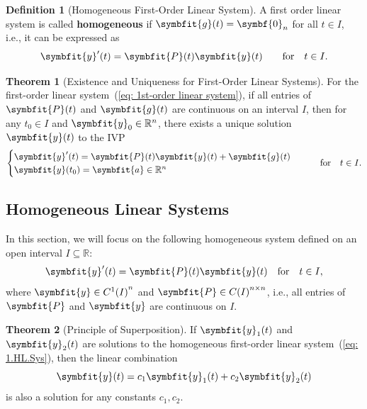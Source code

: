 \documentclass[10pt,UTF8]{article}
\newcommand{\mat}[1]{\symbfit{#1}}
\renewcommand{\vec}[1]{%
  \ifnum0\ifcat#1a1\else0\fi>0
  \symbfit{#1}  %
  \else
  \symbf{#1}  %
  \fi
}
\newenvironment{definitionBox}
{ \bigskip
  \begin{tcolorbox}[colback=blue!5!white,colframe=blue!75!black,parbox=false,before
  upper=\par,before lower=\par]}
  {
\end{tcolorbox}}
\newenvironment{theoremBox}
{ \bigskip
  \begin{tcolorbox}[colback=yellow!5!white,colframe=yellow!75!black,parbox=false,before
  upper=\par,before lower=\par]}
  {
\end{tcolorbox}}
\theoremstyle{definition}
\newtheorem{definition inner}{Definition}[section]
\newenvironment{definition}[1][]
{
  \begin{definitionBox}
  \begin{definition inner}[#1]\hfill\par}
    {
    \end{definition inner}
\end{definitionBox}}
\theoremstyle{definition}
\newtheorem{theorem inner}{Theorem}[section]
\newenvironment{theorem}[1][]
{
  \begin{theoremBox}
  \begin{theorem inner}[#1]\hfill\par}
    {
    \end{theorem inner}
\end{theoremBox}}
\theoremstyle{definition}
\newtheorem*{proof inner}{\textit{Proof}}
\theoremstyle{plain}
\newtheorem{tip inner}{Tip}[section]
\theoremstyle{remark}
\begin{document}
\begin{definition}[Homogeneous First-Order Linear System]
  {}\label{def: Homogeneous 1st-order linear system}
  A first order linear system is called \textbf{homogeneous} if
  \(\vec{g}(t) = \vec{0}_n\) for all \(t\in I\), i.e., it can be expressed as
  \begin{equation*}
    \vec{y}'(t) = \mat{P}(t) \vec{y}(t) \quad \qfor t\in I.
  \end{equation*}
\end{definition}

\begin{theorem}[Existence and Uniqueness for First-Order Linear Systems]
  {}\label{thm: Existence and Uniqueness for 1st-order linear systems}
  For the first-order linear system~(\ref{eq: 1st-order linear system}),
  if all entries of \(\mat{P}(t)\) and \(\vec{g}(t)\) are continuous on
  an interval \(I\), then for any \(t_0 \in I\) and \(\vec{y}_0 \in
  \mathbb{R}^n\),
  there exists a unique solution \(\vec{y}(t)\) to the IVP
  \begin{equation*}
    \begin{cases}
      \vec{y}'(t) = \mat{P}(t) \vec{y}(t) + \vec{g}(t) \\
      \vec{y}(t_0) = \vec{a} \in \mathbb{R}^n
    \end{cases}
    \quad \qfor t\in I.
  \end{equation*}
\end{theorem}

\subsection{Homogeneous Linear Systems}

In this section,
we will focus on the following homogeneous
system defined on an open interval \(I \subseteq \mathbb{R}\):
\begin{equation}
  \vec{y}'(t) = \mat{P}(t) \vec{y}(t) \qfor t\in I,
  \label{eq: 1.HL.Sys}
\end{equation}
where \(\vec{y} \in {C^1(I)}^n\) and
\(\mat{P} \in {C(I)}^{n \times n}\),
i.e., all entries of \(\mat{P}\) and \(\vec{y}\) are continuous on \(I\).

\smallskip

\begin{theorem}[Principle of Superposition]
  {}\label{thm: Principle of Superposition}
  If \(\vec{y}_1(t)\) and \(\vec{y}_2(t)\) are solutions to the homogeneous
  first-order linear system~(\ref{eq: 1.HL.Sys}),
  then the linear combination
  \begin{equation*}
    \vec{y}(t) = c_1 \vec{y}_1(t) + c_2 \vec{y}_2(t)
  \end{equation*}
  is also a solution for any constants \(c_1, c_2\).
\end{theorem}
\end{document}
